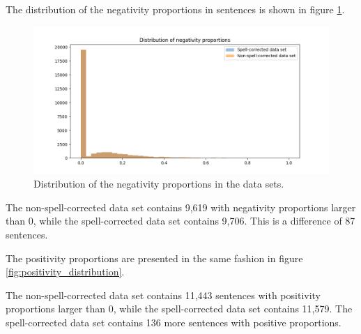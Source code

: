 \begin{table}
    \centering
    \caption{Description of the sentiment analyses distributions.}
    \label{tab:sentiment_analysis}
\end{table}

The distribution of the negativity proportions in sentences is shown in figure \ref{fig:negativity_distribution}.

\begin{figure}[H]
    \centering
    \includegraphics[width=\textwidth]{resources/negativity_distributions.png}
    \caption{Distribution of the negativity proportions in the data sets.}
    \label{fig:negativity_distribution}
\end{figure}

The non-spell-corrected data set contains 9,619 with negativity proportions larger than 0, while the spell-corrected data set contains 9,706. This is a difference of 87 sentences.

The positivity proportions are presented in the same fashion in figure \ref{fig:positivity_distribution}.

The non-spell-corrected data set contains 11,443 sentences with positivity proportions larger than 0, while the spell-corrected data set contains 11,579. The spell-corrected data set contains 136 more sentences with positive proportions.

